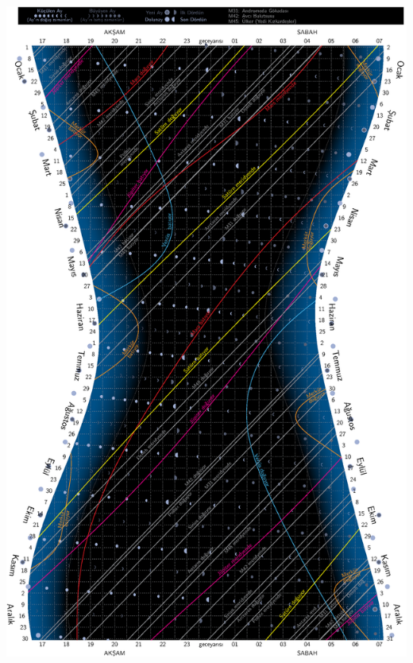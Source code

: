 \documentclass[12pt]{article}
\begin{document}
\centerline{\includegraphics[clip,height=0.9\textheight]{almanac_2012_AFL}}

\end{document}
